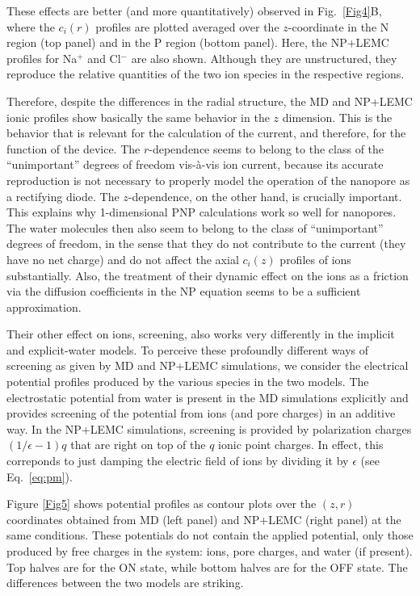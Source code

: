\documentclass[fleqn,10pt]{SelfArx} %
\begin{document}
These effects are better (and more quantitatively) observed in Fig.\ \ref{Fig4}B, where the $c_{i}(r)$ profiles are plotted averaged over the $z$-coordinate in the N region (top panel) and in the P region (bottom panel).
Here, the NP+LEMC profiles for Na$^{+}$ and Cl$^{-}$ are also shown.
Although they are unstructured, they reproduce the relative quantities of the two ion species in the respective regions.

Therefore, despite the differences in the radial structure, the MD and NP+LEMC ionic profiles show basically the same behavior in the $z$ dimension.
This is the behavior that is relevant for the calculation of the current, and therefore, for the function of the device.
The $r$-dependence seems to belong to the class of the ``unimportant'' degrees of freedom vis-\`{a}-vis ion current, because its accurate reproduction is not necessary to properly model the operation of the nanopore as a rectifying diode. 
The $z$-dependence, on the other hand, is crucially important.
This explains why 1-dimensional PNP calculations work so well for nanopores.  
The water molecules then also seem to belong to the class of ``unimportant'' degrees of freedom, in the sense that they do not contribute to the current (they have no net charge) and do not affect the axial $c_{i}(z)$ profiles of ions substantially. 
Also, the treatment of their dynamic effect on the ions as a friction via the diffusion coefficients in the NP equation seems to be a sufficient approximation.

Their other effect on ions, screening, also works very differently in the implicit and explicit-water models.
To perceive these profoundly different ways of screening as given by MD and NP+LEMC simulations, we consider the electrical potential profiles produced by the various species in the two models. 
The electrostatic potential from water is present in the MD simulations explicitly and provides screening of the potential from ions (and pore charges) in an additive way. 
In the NP+LEMC simulations, screening is provided by polarization charges $(1/\epsilon-1)q$ that are right on top of the $q$ ionic point charges. 
In effect, this correponds to just damping the electric field of ions by dividing it by $\epsilon$ (see Eq.\ \ref{eq:pm}).

Figure \ref{Fig5} shows potential profiles as contour plots over the $(z,r)$ coordinates obtained from MD (left panel) and NP+LEMC (right panel) at the same conditions.
These potentials do not contain the applied potential, only those produced by free charges in the system: ions, pore charges, and water (if present). 
Top halves are for the ON state, while bottom halves are for the OFF state.
The differences between the two models are striking.
\end{document}
